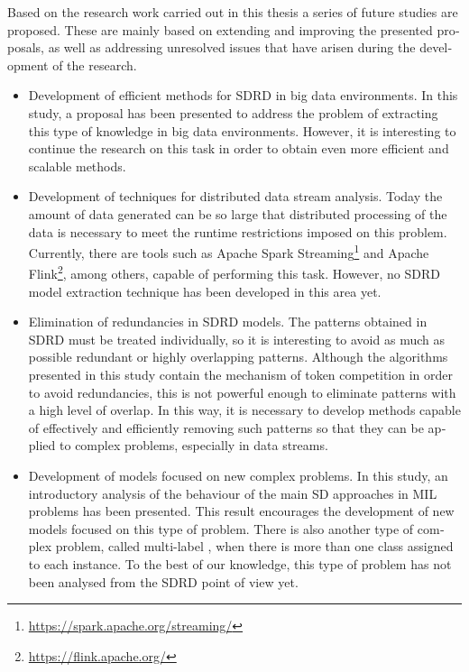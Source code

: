 \documentclass[c5paper,10pt,twoside]{book}	   	%
\begin{document}
\begin{otherlanguage}{british}
Based on the research work carried out in this thesis a series of future studies are proposed. These are mainly based on extending and improving the presented proposals, as well as addressing unresolved issues that have arisen during the development of the research. 


\begin{itemize}
	
	\item Development of efficient methods for \ac{SDRD} in big data environments. In this study, a proposal has been presented to address the problem of extracting this type of knowledge in big data environments. However, it is interesting to continue the research on this task in order to obtain even more efficient and scalable methods. 
	
	\item Development of techniques for distributed data stream analysis. Today the amount of data generated can be so large that distributed processing of the data is necessary to meet the runtime restrictions imposed on this problem. Currently, there are tools such as Apache Spark Streaming\footnote{\url{https://spark.apache.org/streaming/}} and Apache Flink\footnote{\url{https://flink.apache.org/}}, among others, capable of performing this task. However, no \ac{SDRD} model extraction technique has been developed in this area yet.
			
	\item Elimination of redundancies in \ac{SDRD} models. The patterns obtained in \ac{SDRD} must be treated individually, so it is interesting to avoid as much as possible redundant or highly overlapping patterns. Although the algorithms presented in this study contain the mechanism of token competition in order to avoid redundancies, this is not powerful enough to eliminate patterns with a high level of overlap. In this way, it is necessary to develop methods capable of effectively and efficiently removing such patterns so that they can be applied to complex problems, especially in data streams.
			
	\item Development of models focused on new complex problems. In this study, an introductory analysis of the behaviour of the main \ac{SD} approaches in \ac{MIL} problems has been presented. This result encourages the development of new models focused on this type of problem. There is also another type of complex problem, called multi-label \cite{herrera2016multilabel}, when there is more than one class assigned to each instance. To the best of our knowledge, this type of problem has not been analysed from the \ac{SDRD} point of view yet.
			



\end{itemize}
\end{otherlanguage}
\end{document}
